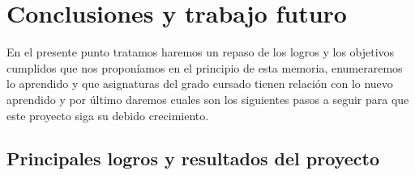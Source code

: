 \chapter{Conclusiones y trabajo futuro}
\label{chap:conclusiones}

En el presente punto tratamos haremos un repaso de los logros y los objetivos cumplidos que nos proponíamos en el principio de esta memoria, enumeraremos lo aprendido y que asignaturas del grado cursado tienen relación con lo nuevo aprendido y por último daremos cuales son los siguientes pasos a seguir para que este proyecto siga su debido crecimiento.

\section{Principales logros y resultados del proyecto}
\label{sec:conclus}
